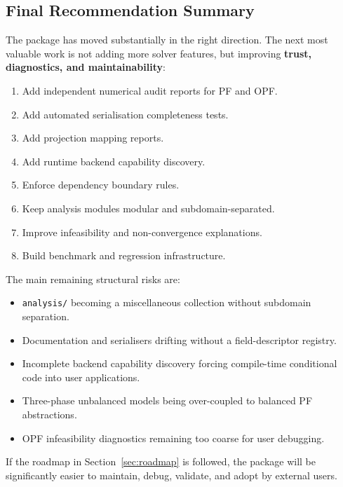 \subsection{Final Recommendation Summary}
\label{sec:final-recommendation}

The package has moved substantially in the right direction.
The next most valuable work is not adding more solver features,
but improving \textbf{trust, diagnostics, and maintainability}:

\begin{enumerate}
  \item Add independent numerical audit reports for PF and OPF.
  \item Add automated serialisation completeness tests.
  \item Add projection mapping reports.
  \item Add runtime backend capability discovery.
  \item Enforce dependency boundary rules.
  \item Keep analysis modules modular and subdomain-separated.
  \item Improve infeasibility and non-convergence explanations.
  \item Build benchmark and regression infrastructure.
\end{enumerate}

The main remaining structural risks are:

\begin{itemize}
  \item \texttt{analysis/} becoming a miscellaneous collection without
        subdomain separation.
  \item Documentation and serialisers drifting without a field-descriptor
        registry.
  \item Incomplete backend capability discovery forcing compile-time
        conditional code into user applications.
  \item Three-phase unbalanced models being over-coupled to balanced PF
        abstractions.
  \item OPF infeasibility diagnostics remaining too coarse for user debugging.
\end{itemize}

If the roadmap in Section~\ref{sec:roadmap} is followed, the package will be
significantly easier to maintain, debug, validate, and adopt by external users.
